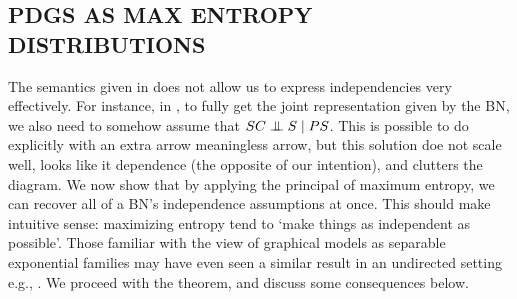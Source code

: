 \documentclass{article}
\newcommand{\MN}{PDG}
\numberwithin{equation}{section}
\begin{document}
\begin{notfocus}
	\subsection{\MN S AS MAX ENTROPY DISTRIBUTIONS} \label{sec:maxent-semantics}
	

	The semantics given in  does not allow us to express independencies very effectively.
	For instance, in , to fully get the joint representation given by the BN, we also need to somehow assume that $SC \mathrel{\perp\mspace{-10mu}\perp} S \mid PS$. This is possible to do explicitly with an extra arrow meaningless arrow, but this solution doe not scale well, looks like it dependence (the opposite of our intention), and clutters the diagram. 
	We now show that by applying the principal of maximum entropy, we can recover all of a BN's independence assumptions at once. This should make intuitive sense: maximizing entropy tend to `make things as independent as possible'. 
	Those familiar with the view of graphical models as separable exponential families may have even seen a similar result in an undirected setting e.g., \parencite[cf.][pp. 37-39]{wainwright2008graphical}. 
	We proceed with the theorem, and discuss some consequences below.
	
	\begin{vfull}	
		

\end{vfull}
\end{notfocus}
\end{document}
